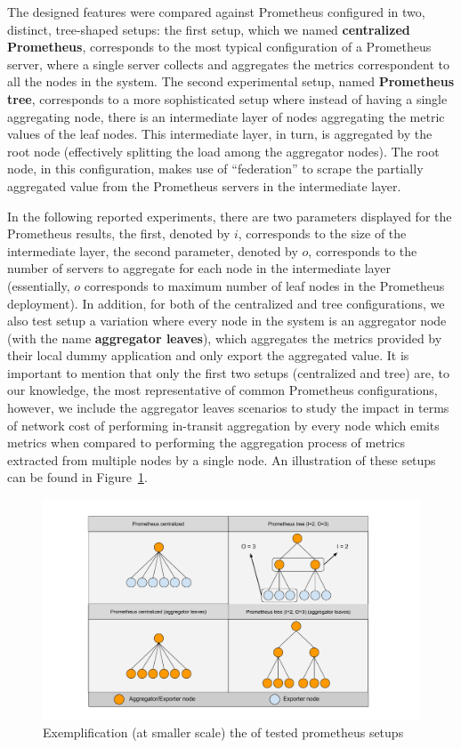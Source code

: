 The designed features were compared against Prometheus configured in two, distinct, tree-shaped setups: the first setup, which we named \textbf{centralized Prometheus}, corresponds to the most typical configuration of a Prometheus server, where a single server collects and aggregates the metrics correspondent to all the nodes in the system. The second experimental setup, named \textbf{Prometheus tree}, corresponds to a more sophisticated setup where instead of having a single aggregating node, there is an intermediate layer of nodes aggregating the metric values of the leaf nodes. This intermediate layer, in turn, is aggregated by the root node (effectively splitting the load among the aggregator nodes). The root node, in this configuration, makes use of ``federation'' to scrape the partially aggregated value from the Prometheus servers in the intermediate layer.

In the following reported experiments, there are two parameters displayed for the Prometheus results, the first, denoted by $i$, corresponds to the size of the intermediate layer, the second parameter, denoted by $o$, corresponds to the number of servers to aggregate for each node in the intermediate layer (essentially, $o$ corresponds to maximum number of leaf nodes in the Prometheus deployment). In addition, for both of the centralized and tree configurations, we also test setup a variation where every node in the system is an aggregator node (with the name \textbf{aggregator leaves}), which aggregates the metrics provided by their local dummy application and only export the aggregated value. It is important to mention that only the first two setups (centralized and tree) are, to our knowledge, the most representative of common Prometheus configurations, however, we include the aggregator leaves scenarios to study the impact in terms of network cost of performing in-transit aggregation by every node which emits metrics when compared to performing the aggregation process of metrics extracted from multiple nodes by a single node. An illustration of these setups can be found in Figure~\ref{fig:sec:eval_prom_setups}.

\begin{figure}
    \centering
    \includegraphics[width=\linewidth]{Chapters/evaluation/figures/aggregation/Prometheus setups.pdf}
    \caption{Exemplification (at smaller scale) the of tested prometheus setups}
    \label{fig:sec:eval_prom_setups}
\end{figure}

